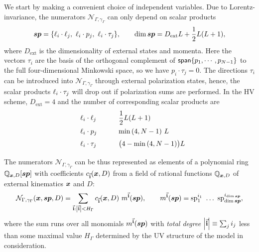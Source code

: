 We start by making a convenient choice of independent variables.
Due to Lorentz-invariance, the numerators $\mathcal{N}_{\Gamma,\gamma_\Gamma}$ can only depend on scalar products
\begin{equation}
  \label{eq:sps_all}
  \vb*{sp} = \{ \sp(\ell_i,\ell_j),~\sp(\ell_i,p_j),~\sp(\ell_i, \tau_j) \}, \qquad \dim{\vb*{sp}} = D_{\text{ext}} L + \frac{1}{2}L(L+1),
\end{equation}
where $D_{\text{ext}}$ is the dimensionality of external states and momenta.
Here the vectors $\tau_i$ are the basis of the orthogonal complement of $\mathsf{span}\{p_1,\cdots,p_{N-1}\}$ to the full four-dimensional Minkowski space,
so we have $p_i \cdot \tau_j = 0$.
The directions $\tau_i$ can be introduced into $\mathcal{N}_{\Gamma,\gamma_\Gamma}$ through external polarization states, hence,
the scalar products $\sp(\ell_i, \tau_j)$ will drop out if polarization sums are performed.
In the HV scheme, $D_{\text{ext}}=4$ and the number of corresponding scalar products are
\begin{equation}
  \label{eq:sp_counts}
  \renewcommand{\arraystretch}{1.5}
  \begin{tabular}[h]{p{10ex} p{20ex}}
       $\sp(\ell_i,\ell_j)$  &   $\dfrac{1}{2}L(L+1)$                \\
        $\sp(\ell_i,p_j)$    &   $\min\qty(4,N-1) ~L$                  \\
       $\sp(\ell_i, \tau_j)$ &   $ \qty\big(4-\min\qty(4,N-1)) L $  \\
  \end{tabular}
\end{equation}

The numerators $\mathcal{N}_{\Gamma,\gamma_\Gamma}$ can be thus represented as elements of a polynomial ring
$\mathbb{Q}_{\vb*{x},D}[\vb*{sp}]$ 
with coefficients $c_{\va{i}}(\vb*{x},D)$ from a field of rational functions $\mathbb{Q}_{\vb*{x},D}$ of external kinematics $\vb*{x}$ and $D$:
\begin{equation}
  \mathcal{N}_{\Gamma,\gamma_\Gamma}(\vb*{x}, \vb*{sp}, D) = \sum_{\va{i} : \abs{\va{i}} < H_{\Gamma}} c_{\va{i}} (\vb*{x},D)~ m^{\va{i}}(\vb*{sp}),
  \qquad m^{\va{i}}(\vb*{sp}) = \mathrm{sp}_1^{i_1} ~\ldots{}~ \mathrm{sp}_{\dim{\vb*{sp}}}^{i_{\dim{\vb*{sp}}}},
\end{equation}
where the sum runs over all monomials $m^{\va{i}}(\vb*{sp})$ with \emph{total degree} $\abs{\va{i}} \equiv \sum_j i_j$ less than
some maximal value $ H_{\Gamma} $ determined by the UV structure of the model in consideration.


